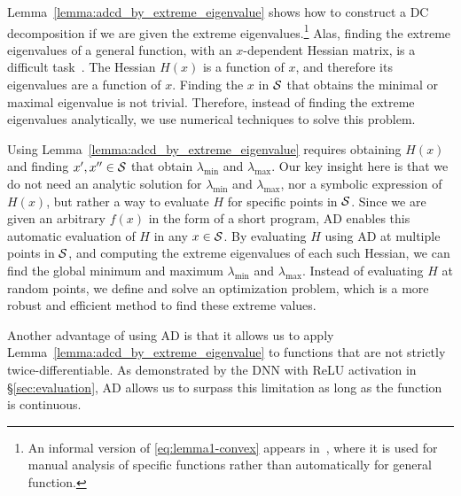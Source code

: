 Lemma~\ref{lemma:adcd_by_extreme_eigenvalue} shows how to construct a DC decomposition if we are given the extreme eigenvalues.\footnote{An informal version of \eqref{eq:lemma1-convex} appears in~\cite{lazerson:lightweight_monitoring}, where it is used for manual analysis of specific functions rather than automatically for general function.}
Alas, finding the extreme eigenvalues of a general function, with an $x$-dependent Hessian matrix, is a difficult task~\cite{interval_matrix_branch_and_bound}.
The Hessian $H(x)$ is a function of $x$, and therefore its eigenvalues are a function of $x$.
Finding the $x$ in $\mathcal{S}$ that obtains the minimal or maximal eigenvalue is not trivial.
Therefore, instead of finding the extreme eigenvalues analytically, we use numerical techniques to solve this problem.


Using Lemma~\ref{lemma:adcd_by_extreme_eigenvalue} requires obtaining $H(x)$ and finding $x',x'' \in \mathcal{S}$ that obtain $\lambda_{\min}$ and $\lambda_{\max}$.
Our key insight here is that we do not need an analytic solution for $\lambda_{\min}$ and $\lambda_{\max}$, nor a symbolic expression of $H(x)$, but rather a way to evaluate $H$ for specific points in $\mathcal{S}$.
Since we are given an arbitrary $f(x)$ in the form of a short program, AD enables this automatic evaluation of $H$ in any $x \in \mathcal{S}$.
By evaluating $H$ using AD at multiple points in $\mathcal{S}$, and computing the extreme eigenvalues of each such Hessian, we can find the global minimum and maximum $\lambda_{\min}$ and $\lambda_{\max}$.
Instead of evaluating $H$ at random points, we define and solve an optimization problem, which is a more robust and efficient method to find these extreme values.

Another advantage of using AD is that it allows us to apply Lemma~\ref{lemma:adcd_by_extreme_eigenvalue} to functions that are not strictly twice-differentiable.
As demonstrated by the DNN with ReLU activation in \S\ref{sec:evaluation}, AD allows us to surpass this limitation as long as the function is continuous.


